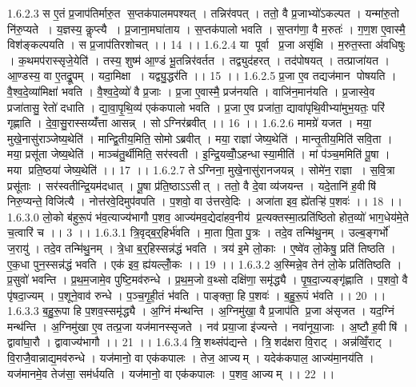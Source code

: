 1.6.2.3
स ए॒तं प्र॒जाप॑तिर्मारु॒त स॒प्तक॑पालमपश्यत् । तन्निर॑वपत् । ततो॒ वै प्र॒जाभ्यो॑ऽकल्पत । यन्मा॑रु॒तो नि॑रु॒प्यते । य॒ज्ञस्य॒ कॢप्त्यै । प्र॒जाना॒मघा॑ताय । स॒प्तक॑पालो भवति । स॒प्तग॑णा॒ वै म॒रुतः॑ । ग॒ण॒श ए॒वास्मै॒ विश॑ङ्कल्पयति । स प्र॒जाप॑तिरशोचत् ।। 14 ।।
1.6.2.4
या पूर्वा प्र॒जा असृ॑क्षि । म॒रुत॒स्ता अ॑वधिषुः । क॒थमप॑रास्सृजे॒येति॑ । तस्य॒ शुष्म॑ आ॒ण्डं भू॒तन्निर॑वर्तत । तद्व्युद॑हरत् । तद॑पोषयत् । तत्प्राजा॑यत । आ॒ण्डस्य॒ वा ए॒तद्रू॒पम् । यदा॒मिक्षा । यद्व्यु॒द्धर॑ति ।। 15 ।।
1.6.2.5
प्र॒जा ए॒व तद्यज॑मान पोषयति । वै॒श्व॒दे॒व्या॑मिक्षा॑ भवति । वै॒श्व॒दे॒व्यो॑ वै प्र॒जाः । प्र॒जा ए॒वास्मै॒ प्रज॑नयति । वाजि॑न॒मान॑यति । प्र॒जास्वे॒व प्रजा॑तासु॒ रेतो॑ दधाति । द्या॒वा॒पृ॒थि॒व्य॑ एक॑कपालो भवति । प्र॒जा ए॒व प्रजा॑ता॒ द्यावा॑पृथि॒वीभ्या॑मुभ॒यतः॒ परि॑ गृह्णाति । दे॒वा॒सु॒रास्सय्यँ॑त्ता आसन्न् । सोऽग्निर॑ब्रवीत् ।। 16 ।।
1.6.2.6
मामग्रे॑ यजत । मया॒ मुखे॒नासु॑राञ्जेष्य॒थेति॑ । मान्द्वि॒तीय॒मिति॒ सोमोऽब्रवीत् । मया॒ राज्ञा॑ जेष्य॒थेति॑ । मान्तृ॒तीय॒मिति॑ सवि॒ता । मया॒ प्रसू॑ता जेष्य॒थेति॑ । माञ्च॑तु॒र्थीमिति॒ सर॑स्वती । इ॒न्द्रि॒यव्वोँ॒ऽहन्धास्या॒मीति॑ । मां प॑ञ्च॒ममिति॑ पू॒षा । मया प्रति॒ष्ठया॑ जेष्य॒थेति॑ ।। 17 ।।
1.6.2.7
तेऽग्निना॒ मुखे॒नासु॑रानजयन्न् । सोमे॑न॒ राज्ञा । स॒वि॒त्रा प्रसू॑ताः । सर॑स्वतीन्द्रि॒यम॑दधात् । पू॒षा प्र॑ति॒ष्ठाऽऽसीत् । ततो॒ वै दे॒वा व्य॑जयन्त । यदे॒तानि॑ ह॒वीषि॑ निरु॒प्यन्ते॒ विजि॑त्यै । नोत्त॑रवे॒दिमुप॑वपति । प॒शवो॒ वा उ॑त्तरवे॒दिः । अजा॑ता इव॒ ह्ये॑तऱ्हि॑ प॒शवः॑ ।। 18 ।।
1.6.3.0
लो॒को ब॑हुरू॒पं भ॑व॒त्याज्य॑भागौ प॒शव॒ आज्य॑मव॒द्येदा॑हव॒नीय॑ प्र॒त्यक्तस्मा॒त्प्रति॑ष्ठितो होत॒व्यो॑ भाग॒धेय॑मे॒ते च॒त्वारि॑ च ।। 3 ।।
1.6.3.1
त्रि॒वृद्ब॒र्॒हिर्भ॑वति । मा॒ता पि॒ता पु॒त्रः । तदे॒व तन्मि॑थु॒नम् । उल्ब॒ङ्गर्भो॑ ज॒रायु॑ । तदे॒व तन्मि॑थु॒नम् । त्रे॒धा ब॒र्॒हिस्सन्न॑द्धं भवति । त्रय॑ इ॒मे लो॒काः । ए॒ष्वे॑व लो॒केषु॒ प्रति॑ तिष्ठति । ए॒क॒धा पुन॒स्सन्न॑द्धं भवति । एक॑ इव॒ ह्य॑यल्लोँ॒कः ।। 19 ।।
1.6.3.2
अ॒स्मिन्ने॒व तेन॑ लो॒के प्रति॑तिष्ठति । प्र॒सुवो॑ भवन्ति । प्र॒थ॒म॒जामे॒व पुष्टि॒मव॑रुन्धे । प्र॒थ॒म॒जो व॒थ्सो दक्षि॑णा॒ समृ॑द्ध्यै । पृ॒ष॒दा॒ज्यङ्गृ॑ह्णाति । प॒शवो॒ वै पृ॑षदा॒ज्यम् । प॒शूने॒वाव॑ रुन्धे । प॒ञ्च॒गृ॒ही॒तं भ॑वति । पाङ्क्ता॒ हि प॒शवः॑ । ब॒हु॒रू॒पं भ॑वति ।। 20 ।।
1.6.3.3
ब॒हु॒रू॒पा हि प॒शव॒स्समृ॑द्ध्यै । अ॒ग्निं म॑न्थन्ति । अ॒ग्निमु॑खा॒ वै प्र॒जाप॑ति प्र॒जा अ॑सृजत । यद॒ग्निं मन्थ॑न्ति । अ॒ग्निमु॑खा ए॒व तत्प्र॒जा यज॑मानस्सृजते । नव॑ प्रया॒जा इ॑ज्यन्ते । नवा॑नूया॒जाः । अ॒ष्टौ ह॒वीषि॑ । द्वावा॑घा॒रौ । द्वावाज्य॑भागौ ।। 21 ।।
1.6.3.4
त्रि॒॒शथ्संप॑द्यन्ते । त्रि॒॒शद॑क्षरा वि॒राट् । अन्न॑व्विँ॒राट् । वि॒राजै॒वान्नाद्य॒मव॑रुन्धे । यज॑मानो॒ वा एक॑कपालः । तेज॒ आज्यम् । यदेक॑कपाल॒ आज्य॑मा॒नय॑ति । यज॑मानमे॒व तेज॑सा॒ सम॑र्धयति । यज॑मानो॒ वा एक॑कपालः । प॒शव॒ आज्यम् ।। 22 ।।
